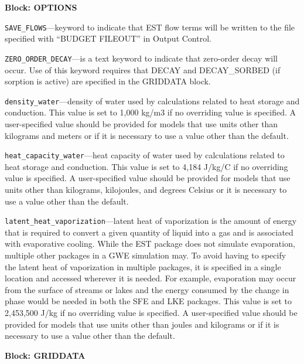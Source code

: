 
\item \textbf{Block: OPTIONS}

\begin{description}
\item \texttt{SAVE\_FLOWS}---keyword to indicate that EST flow terms will be written to the file specified with ``BUDGET FILEOUT'' in Output Control.

\item \texttt{ZERO\_ORDER\_DECAY}---is a text keyword to indicate that zero-order decay will occur.  Use of this keyword requires that DECAY and DECAY\_SORBED (if sorption is active) are specified in the GRIDDATA block.

\item \texttt{density\_water}---density of water used by calculations related to heat storage and conduction.  This value is set to 1,000 kg/m3 if no overriding value is specified.  A user-specified value should be provided for models that use units other than kilograms and meters or if it is necessary to use a value other than the default.

\item \texttt{heat\_capacity\_water}---heat capacity of water used by calculations related to heat storage and conduction.  This value is set to 4,184 J/kg/C if no overriding value is specified.  A user-specified value should be provided for models that use units other than kilograms, kilojoules, and degrees Celsius or it is necessary to use a value other than the default.

\item \texttt{latent\_heat\_vaporization}---latent heat of vaporization is the amount of energy that is required to convert a given quantity of liquid into a gas and is associated with evaporative cooling.  While the EST package does not simulate evaporation, multiple other packages in a GWE simulation may.  To avoid having to specify the latent heat of vaporization in multiple packages, it is specified in a single location and accessed wherever it is needed.  For example, evaporation may occur from the surface of streams or lakes and the energy consumed by the change in phase would be needed in both the SFE and LKE packages.  This value is set to 2,453,500 J/kg if no overriding value is specified.  A user-specified value should be provided for models that use units other than joules and kilograms or if it is necessary to use a value other than the default.

\end{description}
\item \textbf{Block: GRIDDATA}

